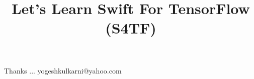 \documentclass[xcolor=dvipsnames,compress,t,pdf]{beamer}
\title[\insertframenumber /\inserttotalframenumber]{Let's Learn Swift For TensorFlow (S4TF)}
\begin{document}
	\begin{frame}
	\titlepage
	\end{frame}

	
	
	\begin{frame}[c]{}
	Thanks ...
	\vspace{5mm}
	yogeshkulkarni@yahoo.com
	\end{frame}
\end{document}

